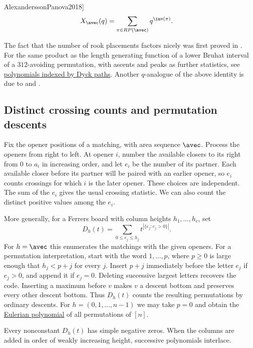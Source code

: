\begin{theorem}[See, for example, \cite[Sec.~9]{AlexanderssonPanova2018}]
\[
X_\avec(q) = \sum_{\pi \in RP(\avec)} q^{\inv(\pi)}.
\]
\end{theorem}

The fact that the number of rook placements factors
nicely was first proved in \cite{GoldmanJoichiWhite1975}.
For the same product as the length generating function of a lower Bruhat
interval of a $312$-avoiding permutation, with ascents and peaks as further
statistics, see \hyperref[dyckPathBruhatPolynomials]{polynomials indexed by
Dyck paths}.
Another $q$-analogue of the above identity is due to 
and  \cite{GarsiaRemmel1986}.


\subsection[ferrersDistinctValues]{Distinct crossing counts and permutation descents}

Fix the opener positions of a matching, with area sequence $\avec$.
Process the openers from right to left. At opener $i$, number the
available closers to its right from $0$ to $a_i$ in increasing order,
and let $e_i$ be the number of its partner. Each available closer before
its partner will be paired with an earlier opener, so $e_i$ counts crossings
for which $i$ is the later opener. These choices are independent.
The sum of the $e_i$ gives the usual crossing statistic. We can also
count the distinct positive values among the $e_i$.

More generally, for a Ferrers board with column heights $h_1,\ldots,h_c$, set
\[
 D_h(t)=\sum_{0\leq e_j\leq h_j}t^{|\{e_j:e_j>0\}|}.
\]
For $h=\avec$ this enumerates the matchings with the given openers.
For a permutation interpretation, start with the word $1,\ldots,p$,
where $p\geq0$ is large enough that $h_j<p+j$ for every $j$.
Insert $p+j$ immediately before the letter $e_j$ if $e_j>0$, and
append it if $e_j=0$. Deleting successive largest letters recovers the
code. Inserting a maximum before $v$ makes $v$ a descent bottom and
preserves every other descent bottom. Thus $D_h(t)$ counts the resulting
permutations by ordinary descents. For $h=(0,1,\ldots,n-1)$ we may
take $p=0$ and obtain the \hyperref[eulerianPolynomial]{Eulerian polynomial}
of all permutations of $[n]$.

\begin{proposition}
Every nonconstant $D_h(t)$ has simple negative zeros. When the columns
are added in order of weakly increasing height, successive polynomials
interlace.
\end{proposition}

